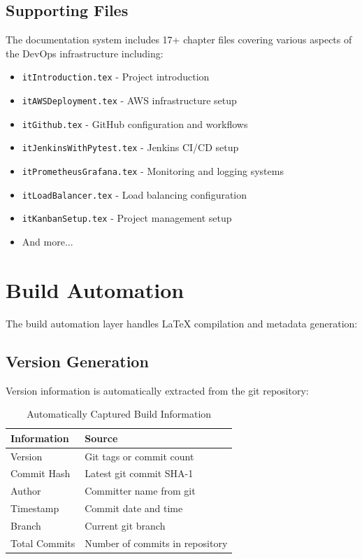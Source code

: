 \subsection{Supporting Files}

The documentation system includes 17+ chapter files covering various aspects of the DevOps infrastructure including:

\begin{itemize}
    \item \texttt{itIntroduction.tex} - Project introduction
    \item \texttt{itAWSDeployment.tex} - AWS infrastructure setup
    \item \texttt{itGithub.tex} - GitHub configuration and workflows
    \item \texttt{itJenkinsWithPytest.tex} - Jenkins CI/CD setup
    \item \texttt{itPrometheusGrafana.tex} - Monitoring and logging systems
    \item \texttt{itLoadBalancer.tex} - Load balancing configuration
    \item \texttt{itKanbanSetup.tex} - Project management setup
    \item And more...
\end{itemize}

\section{Build Automation}
\label{sec:BuildAutomation}

The build automation layer handles LaTeX compilation and metadata generation:

\subsection{Version Generation}

Version information is automatically extracted from the git repository:

\begin{table}[h]
\centering
\begin{tabular}{|l|l|}
\hline
\textbf{Information} & \textbf{Source} \\
\hline
Version & Git tags or commit count \\
\hline
Commit Hash & Latest git commit SHA-1 \\
\hline
Author & Committer name from git \\
\hline
Timestamp & Commit date and time \\
\hline
Branch & Current git branch \\
\hline
Total Commits & Number of commits in repository \\
\hline
\end{tabular}
\caption{Automatically Captured Build Information}
\label{table:build-info}
\end{table}

